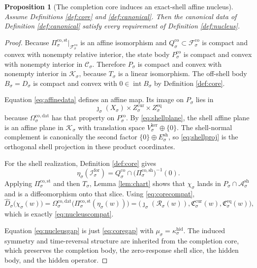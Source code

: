\documentclass[11pt]{article}
\newcommand{\ForSpace}[1]{\mathcal I_{#1}^{\mathrm{for}}}
\newcommand{\Reduction}[1]{\mathcal R_{#1}}
\newcommand{\CurrentCarrier}[1]{\mathfrak C_{#1}^{\mathrm{cur}}}
\newcommand{\EqCarrier}[1]{\mathfrak C_{#1}^{\mathrm{eq}}}
\newcommand{\CoreState}[1]{\mathcal C_{#1}}
\newcommand{\CoreAffine}[1]{\mathcal F_{#1}^{\mathrm{co}}}
\newcommand{\CoreBody}[1]{Q_{#1}^{\mathrm{co}}}
\newcommand{\CoreStateBody}[1]{P_{#1}^{\mathrm{co}}}
\newcommand{\CoreStateProj}[1]{\Pi_{#1}^{\mathrm{co,st}}}
\newcommand{\CoreShellProj}[1]{\Pi_{#1}^{\mathrm{co,sh}}}
\newcommand{\CoreDataMap}[1]{\Omega_{#1}^{\mathrm{co,dat}}}
\newcommand{\CoreEmbed}[1]{\eta_{#1}}
\newcommand{\GapBody}[1]{D_{#1}}
\newcommand{\CoordSpace}[1]{\mathcal K_{#1}}
\newcommand{\CoordBody}[1]{P_{#1}}
\newcommand{\NormalBody}[1]{B_{#1}}
\newcommand{\AffineData}[1]{\widehat D_{#1}}
\newcommand{\ShellAffine}[1]{\mathcal A_{#1}^{\mathrm{sh}}}
\newcommand{\ShellNormal}[1]{E_{#1}^{\mathrm{sh}}}
\newcommand{\ShellEmbed}[1]{\chi_{#1}}
\newcommand{\ShellKer}[1]{V_{#1}^{\mathrm{ker}}}
\newcommand{\CoordIso}[1]{T_{#1}}
\newtheorem{proposition}{Proposition}
\begin{document}
\begin{proposition}[The completion core induces an exact-shell affine nucleus]
\label{prop:derive}
Assume Definitions \ref{def:core} and \ref{def:canonical}. Then the canonical data of Definition \ref{def:canonical} satisfy every requirement of Definition \ref{def:nucleus}.
\end{proposition}

\begin{proof}
Because \(\CoreStateProj{\sigma}\big|_{\CoreAffine{\sigma}}\) is an affine isomorphism and \(\CoreBody{\sigma}\subset\CoreAffine{\sigma}\) is compact and convex with nonempty relative interior, the state body \(\CoreStateBody{\sigma}\) is compact and convex with nonempty interior in \(\CoreState{\sigma}\). Therefore \(\CoordBody{\sigma}\) is compact and convex with nonempty interior in \(\CoordSpace{\sigma}\), because \(\CoordIso{\sigma}\) is a linear isomorphism. The off-shell body \(\NormalBody{\sigma}=\GapBody{\sigma}\) is compact and convex with \(0\in\operatorname{int}\NormalBody{\sigma}\) by Definition \ref{def:core}.

Equation \eqref{eq:affinedata} defines an affine map. Its image on \(\CoordBody{\sigma}\) lies in
\[
\jmath_{\sigma}(X_{\sigma})\times Z_{\sigma}^{\mathrm{cur}}\times Z_{\sigma}^{\mathrm{eq}}
\]
because \(\CoreDataMap{\sigma}\) has that property on \(\CoreStateBody{\sigma}\). By \eqref{eq:shellplane}, the shell affine plane is an affine plane in \(\CoordSpace{\sigma}\) with translation space \(\ShellKer{\sigma}\oplus\{0\}\). The shell-normal complement is canonically the second factor \(\{0\}\oplus\ShellNormal{\sigma}\), so \eqref{eq:shellproj} is the orthogonal shell projection in these product coordinates.

For the shell realization, Definition \ref{def:core} gives
\[
\CoreEmbed{\sigma}(\ForSpace{\sigma})
=
\CoreBody{\sigma}\cap
\bigl(\CoreShellProj{\sigma}\bigr)^{-1}(0).
\]
Applying \(\CoreStateProj{\sigma}\) and then \(\CoordIso{\sigma}\), Lemma \ref{lem:chart} shows that \(\ShellEmbed{\sigma}\) lands in \(\CoordBody{\sigma}\cap\ShellAffine{\sigma}\) and is a diffeomorphism onto that slice. Using \eqref{eq:corecompat},
\[
\AffineData{\sigma}\bigl(\ShellEmbed{\sigma}(w)\bigr)
=
\CoreDataMap{\sigma}
\bigl(
\CoreStateProj{\sigma}(\CoreEmbed{\sigma}(w))
\bigr)
=
\bigl(
\jmath_{\sigma}(\Reduction{\sigma}(w)),
\CurrentCarrier{\sigma}(w),
\EqCarrier{\sigma}(w)
\bigr),
\]
which is exactly \eqref{eq:nucleuscompat}.

Equation \eqref{eq:nucleusgap} is just \eqref{eq:coregap} with \(\mu_{\sigma}=\kappa_{\sigma}^{\mathrm{hid}}\). The induced symmetry and time-reversal structure are inherited from the completion core, which preserves the completion body, the zero-response shell slice, the hidden body, and the hidden operator.


\end{proof}
\end{document}

